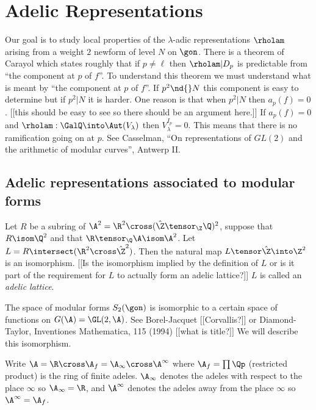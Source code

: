 \documentclass{report}
\begin{document}
\chapter{Adelic Representations}
Our goal is to study local properties of the
$\lambda$-adic representations $\rholam$ arising
from a weight $2$ newform of level $N$ on
$\gon$. There is a theorem of Carayol which states
roughly that if $p\neq\ell$ then $\rholam|D_p$
is predictable from ``the component at $p$ of
$f$''. To understand this theorem we
must understand what
is meant by ``the component at $p$ of $f$''.
If $p^2\nd{}N$ this component is easy to determine
but if $p^2|N$ it is harder. One reason is that
when $p^2|N$ then $a_p(f)=0$. [[this should be
easy to see so there should be an argument here.]]
If $a_p(f)=0$ and $\rholam:\GalQ\into\Aut(V_{\lambda})$
then $V_{\lambda}^{I_p}=0$. This means that there
is no ramification going on at $p$. See Casselman,
``On representations of $GL(2)$ and the arithmetic
of modular curves'', Antwerp II.

\section{Adelic representations associated to modular forms}
Let $R$ be a subring of $\A^2=\R^2\cross(\hat{\Z}\tensor_{\Z}\Q)^2$,
suppose that $R\isom\Q^2$ and that $\R\tensor_{\Q}\A\isom\A^2$.
Let $L=R\intersect(\R^2\cross\hat{\Z}^2)$. Then the
natural map $L\tensor\hat{\Z}\into\Z^2$ is an isomorphism.
[[Is the isomorphism implied by the definition of $L$
or is it part of the requirement for $L$ to actually
form an adelic lattice?]] $L$ is called an
{\em adelic lattice}.

The space of modular forms $S_2(\gon)$ is isomorphic to
a certain space of functions on $G(\A)=\GL(2,\A)$.
See Borel-Jacquet [[Corvallis?]] or
Diamond-Taylor, Inventiones Mathematica, 115 (1994)
[[what is title?]] We will describe this isomorphism.

Write $\A=\R\cross\A_f=\A_{\infty}\cross\A^{\infty}$
where $\A_f=\prod\Qp$ (restricted product) is the ring of finite
adeles. $\A_{\infty}$ denotes the adeles with respect to the place
$\infty$ so $\A_{\infty}=\R$, and $\A^{\infty}$ denotes the
adeles away from the place $\infty$ so $\A^{\infty}=\A_f$.
\end{document}
